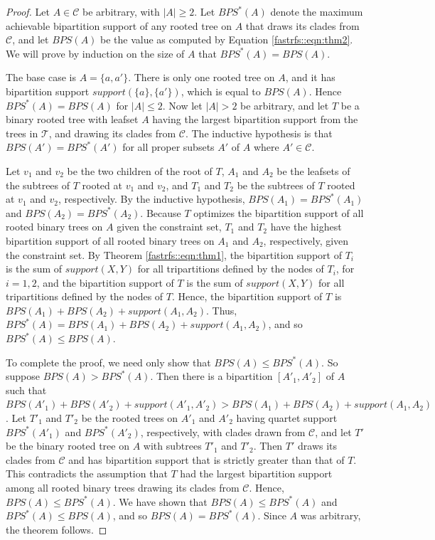 \begin{proof}
Let $A \in \mathcal{C}$ be arbitrary, with $|A|\geq 2$.
Let $BPS^*(A)$ denote the maximum achievable bipartition support
of any
rooted tree on $A$ that draws its clades from $\mathcal{C}$,
and let $BPS(A)$ be the value as
computed by Equation \ref{fastrfs::eqn:thm2}.
We will prove by induction on the size of $A$ that
$BPS^*(A)=BPS(A)$.

The base case is  $A = \{a,a'\}$. There is
only one rooted tree on 
$A$, and it has
bipartition support
$support(\{a\},\{a'\})$,
which is equal to $BPS(A)$. Hence
$BPS^*(A)=BPS(A)$ for $|A| \leq 2$.
Now let $|A| > 2$ be arbitrary, and let 
$T$ be a binary rooted tree with leafset $A$
having the  largest bipartition support from the 
trees in $\mathcal{T}$, and drawing its clades
from $\mathcal{C}$.
The inductive hypothesis is that $BPS(A')=BPS^*(A')$ for
all proper subsets $A'$ of $A$ where $A' \in \mathcal{C}$.

Let $v_1$ and $v_2$ be the two children of the
root of $T$, $A_1$ and $A_2$ be the
leafsets of the subtrees of $T$ rooted at
$v_1$ and $v_2$, and $T_1$ and $T_2$ be the subtrees of
$T$ rooted at $v_1$ and $v_2$, respectively.
By the inductive hypothesis,
 $BPS(A_1)=BPS^*(A_1)$ and $BPS(A_2)=BPS^*(A_2)$.
Because $T$ optimizes the bipartition support
of all rooted binary trees on $A$
given the constraint set, 
$T_1$ and $T_2$ have the highest bipartition support
of all rooted binary trees on $A_1$ and $A_2$, respectively,
given the constraint set.
By Theorem \ref{fastrfs::eqn:thm1}, the bipartition support of
$T_i$ is
the sum of $support(X,Y)$ for all
tripartitions defined by the nodes of $T_i$, for $i=1,2$, and
the bipartition support of $T$  is the sum of $support(X,Y)$
for all tripartitions defined by the nodes of $T$.
Hence, the bipartition support
of $T$ is $BPS(A_1) + BPS(A_2) + support(A_1,A_2)$.
Thus, $BPS^*(A) = BPS(A_1)+BPS(A_2)+support(A_1,A_2)$,
and so $BPS^*(A) \leq BPS(A)$.


To complete the proof, we need only show that $BPS(A) \leq BPS^*(A)$.
So suppose $BPS(A) > BPS^*(A)$. Then
there is a bipartition 
$[A'_1, A'_2]$ of $A$ such that
$BPS(A'_1)+BPS(A'_2)+support(A'_1,A'_2) > BPS(A_1)+BPS(A_2) + support(A_1,A_2)$.
Let $T'_1$ and $T'_2$ be the rooted trees on $A'_1$ and $A'_2$
having quartet support $BPS^*(A'_1)$ and $BPS^*(A'_2)$, respectively, 
with clades drawn from $\mathcal{C}$, 
and let $T'$ be the binary rooted tree on $A$
with subtrees $T'_1$ and $T'_2$.
Then $T'$ draws its clades from $\mathcal{C}$ and
has bipartition support that is strictly greater than
that of $T$. This contradicts the assumption that
$T$ had the largest bipartition support among 
all rooted binary trees drawing its clades from 
$\mathcal{C}$.
Hence, $BPS(A)\leq BPS^*(A)$.
We have shown that $BPS(A) \leq BPS^*(A)$
and $BPS^*(A) \leq BPS(A)$, and so $BPS(A)=BPS^*(A)$.
Since $A$ was arbitrary, the theorem follows.
\end{proof}



